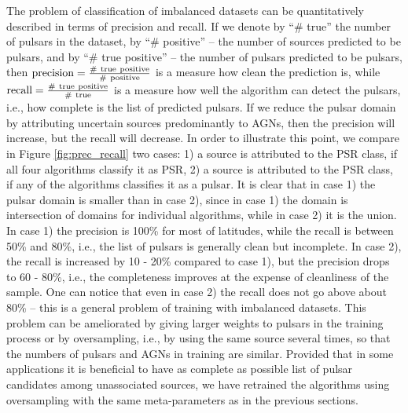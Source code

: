 The problem of classification of imbalanced datasets can be quantitatively described in terms of precision and recall.
If we denote by ``\# true'' the number of pulsars in the dataset, by ``\# positive'' -- the number of sources predicted to be pulsars, and by 
``\# true positive'' -- the number of pulsars predicted to be pulsars, then $\rm precision = \frac{\#\ true\ positive}{\#\ positive}$ is a measure how clean the prediction is, while $\rm recall = \frac{\#\ true\ positive}{\#\ true}$ is a measure how well the algorithm can detect the pulsars, i.e., how complete is the list of predicted pulsars.
If we reduce the pulsar domain by attributing uncertain sources predominantly to AGNs, then the precision will increase, but the recall will decrease.
In order to illustrate this point, we compare in Figure \ref{fig:prec_recall} two cases: 1) a source is attributed to the PSR class, if all four algorithms classify it as PSR, 2) a source is attributed to the PSR class, if any of the algorithms classifies it as a pulsar.
It is clear that in case 1) the pulsar domain is smaller than in case 2), since in case 1) the domain is intersection of domains for individual algorithms, while in case 2) it is the union.
In case 1) the precision is 100\% for most of latitudes, while the recall is between 50\% and 80\%, i.e., the list of pulsars is generally clean but incomplete.
In case 2), the recall is increased by 10 - 20\% compared to case 1), but the precision drops to 60 - 80\%, i.e., the completeness improves at the expense of cleanliness of the sample.
One can notice that even in case 2) the recall does not go above about 80\% -- this is a general problem of training with imbalanced datasets.
This problem can be ameliorated by giving larger weights to pulsars in the training process or by oversampling, i.e., by using the same source several times, so that the numbers of pulsars and AGNs in training are similar.
Provided that in some applications it is beneficial to have as complete as possible list of pulsar candidates among unassociated sources, we have retrained the algorithms using oversampling with the same meta-parameters as in the previous sections.




